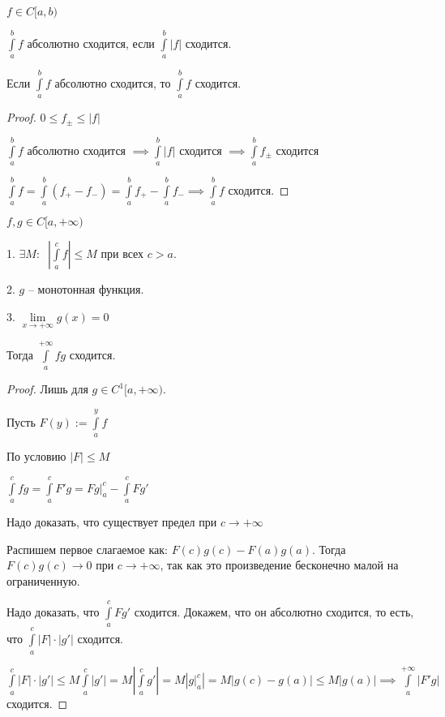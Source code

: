 
\begin{definition} \thmslashn
	
	$f \in C[a,b)$
	
	$\int\limits_a^b f$ абсолютно сходится, если $\int\limits_a^b |f|$ сходится.
	
\end{definition}

\begin{theorem} \thmslashn
	
	Если $\int\limits_a^b f$ абсолютно сходится, то $\int\limits_a^b f$ сходится.
	
\end{theorem} 

\begin{proof} \thmslashn
    
    $ 0 \le f_{\pm} \le |f|$
    
    $\int\limits_a^b f$ абсолютно сходится $\implies \int\limits_a^b |f|$ сходится $\implies \int\limits_a^b f_{\pm}$ сходится
    
    $\int\limits_a^b f = \int\limits_a^b (f_{+} - f_{-}) = \int\limits_a^b f_{+} - \int\limits_a^b f_{-} \implies \int\limits_a^b f$ сходится.
    
\end{proof}

\begin{theorem} \thmslashn
	
	$f, g \in C[a,+\infty)$
	
	1. $\exists M : \;\; |\int\limits_a^c f| \le M$ при всех $c > a$.
	
	2. $g$ -- монотонная функция.
	
	3. $\lim\limits_{x \to +\infty} g(x) = 0$
	
	Тогда $\int\limits_a^{+\infty} fg$ сходится.
\end{theorem}

\begin{proof} \thmslashn

    Лишь для $g \in C^1[a,+\infty)$.
    
    Пусть $F(y) := \int\limits_a^y f$
    
    По условию $|F| \le M$
    
    $\int\limits_a^c fg = \int\limits_a^c F'g = Fg \Big|_a^c - \int\limits_a^c Fg'$
    
    Надо доказать, что существует предел при  $c \to +\infty$
    
    Распишем первое слагаемое как: $F(c)g(c) - F(a)g(a)$. Тогда $F(c)g(c) \to 0$ при $c \to +\infty$, так как это произведение бесконечно малой на ограниченную.
    
    Надо доказать, что $\int\limits_a^c Fg'$ сходится. Докажем, что он абсолютно сходится, то есть, что $\int\limits_a^c |F| \cdot |g'|$ сходится. 
    
    $\int\limits_a^c |F| \cdot |g'| \le M \int\limits_a^c |g'| = M |\int\limits_a^c g'| = M | g \Big|_a^c | = M|g(c) - g(a)| \le M|g(a)| \implies \int\limits_a^{+\infty} |F'g|$ сходится.
    
    
\end{proof}

